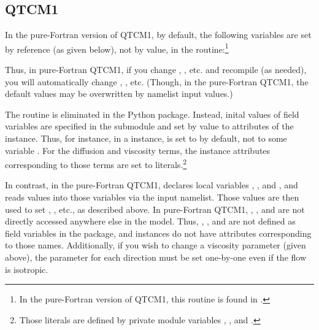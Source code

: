 	\subsection{QTCM1 }   \label{sec:driverinit.diffs}

In the pure-Fortran version of QTCM1, by default, the following variables are
set by reference (as given below), not by value, in the 
routine:\footnote%
	{In the pure-Fortran version of QTCM1, this routine is found
	in .}
\begin{codeblock}
\end{codeblock}

Thus, in pure-Fortran QTCM1, if you change ,
, etc.
and recompile (as needed), you will automatically change 
, , etc.
(Though, in the pure-Fortran QTCM1, the default values may be overwritten by
namelist input values.)

The  routine is eliminated
in the Python  package.  Instead, inital values 
of field variables are specified in the  submodule
and set by value to attributes of the  instance.
Thus, for instance, in a  instance,  
is set to  by default, not to some variable
.  For the diffusion and viscosity terms,
the  instance attributes corresponding to those
terms are set to literals.\footnote%
	{Those literals are defined by  private
	module variables , ,
	and .}

In contrast, in the pure-Fortran QTCM1,
 declares local
variables , , and ,
and reads values into those variables via the input namelist.
Those values are then used to set
, , etc., as described above.
In pure-Fortran QTCM1, , , and 
are not directly accessed anywhere else in the model.
Thus, , , and  are not
defined as field variables in the  package, and
 instances do not have attributes corresponding
to those names.
Additionally, if you wish to change a viscosity parameter
 (given above), the parameter for each direction
must be set one-by-one even if the flow is isotropic.


